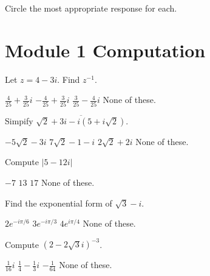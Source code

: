 \documentclass[12pt]{exam}
\begin{document}
\begin{center}
\end{center}
\vspace{0.1in}

\vspace{12pt}

Circle the most appropriate response for each.

\section*{Module 1 Computation}

\begin{questions}

\setcounter{question}{0}


\question Let \(z=4-3i\). Find \(z^{-1}\).
\begin{choices}
\choice \(\frac{4}{25}+\frac{3}{25}i\)
\choice \(-\frac{4}{25}+\frac{3}{25}i\)
\choice \(\frac{3}{25}-\frac{4}{25}i\)
\choice None of these. 
\end{choices}

\question Simpify \(\overline{\sqrt2 + 3i - i(5+i\sqrt2)}\). 
\begin{choices}
\choice \(-5\sqrt2 -3i\)
\choice \(7\sqrt2 -1-i\)
\choice \(2\sqrt2 +2i \)
\choice None of these. 
\end{choices}

\question Compute \(|5-12i|\)
\begin{choices}
\choice \(-7\)
\choice \(13\)
\choice \(17\)
\choice None of these. 
\end{choices}

\question Find the exponential form of \(\sqrt3-i\).
\begin{choices}
\choice \(2e^{-i\pi/6}\)
\choice \(3e^{-i\pi/3}\)
\choice \(4e^{i\pi/4}\)
\choice None of these. 
\end{choices}

\question Compute \((2-2\sqrt3 i)^{-3}\).
\begin{choices}
\choice \(\frac{1}{16}i\)
\choice \(\frac{1}{4}-\frac{1}{3}i\)
\choice \(-\frac{1}{64}\)
\choice None of these. 
\end{choices}
\end{questions}
\end{document}

